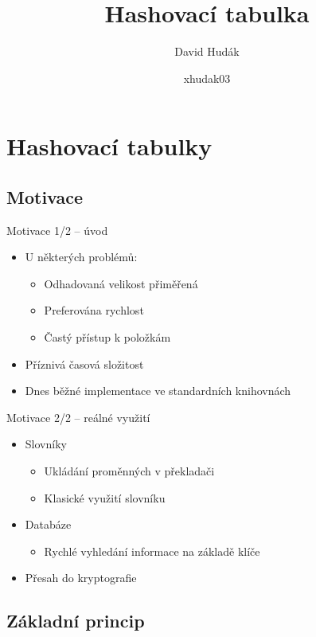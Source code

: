 \documentclass[14pt]{beamer}
\title{Hashovací tabulka}
\author{David Hudák}
\date{xhudak03}
\begin{document}
\maketitle
\section{Hashovací tabulky}
\subsection{Motivace}
\begin{frame}{Motivace 1/2 -- úvod}
    \begin{itemize}
        \item U některých problémů:
        \begin{itemize}
            \item Odhadovaná velikost přiměřená
            \item Preferována rychlost
            \item Častý přístup k položkám
        \end{itemize}
        \item Příznivá časová složitost
        \item Dnes běžné implementace ve standardních knihovnách
    \end{itemize}
\end{frame}
\begin{frame}{Motivace 2/2 -- reálné využití}
    \begin{itemize}
        \item Slovníky\cite{stack}
        \begin{itemize}
            \item Ukládání proměnných v překladači
            \item Klasické využití slovníku
        \end{itemize}
        \pause
        \item Databáze
        \begin{itemize}
            \item Rychlé vyhledání informace na základě klíče
        \end{itemize}
        \pause
        \item Přesah do kryptografie
    \end{itemize}
\end{frame}
\subsection{Základní princip}
\end{document}
